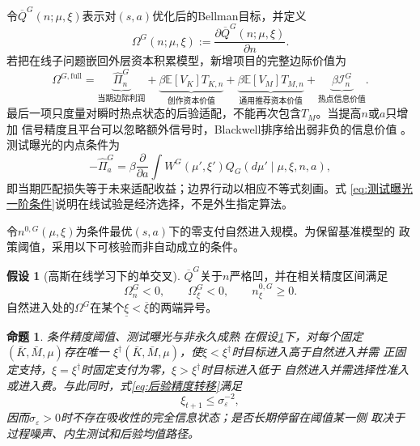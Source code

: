 \documentclass[UTF8, a4paper, 12pt, fontset=fandol]{ctexart}
\newtheorem{proposition}[theorem]{命题}
\theoremstyle{definition}
\newtheorem{assumption}{假设}[section]
\theoremstyle{remark}
\newcommand{\E}{\mathbb{E}}
\begin{document}
令$\overline Q^G(n;\mu,\xi)$表示对$(s,a)$优化后的Bellman目标，并定义
\begin{equation}
  \Omega^G(n;\mu,\xi)
  :=\frac{\partial\overline Q^G(n;\mu,\xi)}{\partial n}.
  \label{eq:贝叶斯动态边际进入}
\end{equation}
若把在线子问题嵌回外层资本积累模型，新增项目的完整边际价值为
\begin{equation}
  \Omega^{G,\mathrm{full}}
  =\underbrace{\widehat\Pi_n^G}_{\text{当期边际利润}}
  +\underbrace{\beta\E[V_K]T_{K,n}}
  _{\text{创作资本价值}}
  +\underbrace{\beta\E[V_M]T_{M,n}}
  _{\text{通用推荐资本价值}}
  +\underbrace{\beta\mathcal I_n^G}_{\text{热点信息价值}}.
  \label{eq:贝叶斯边际价值分解}
\end{equation}
最后一项只度量对瞬时热点状态的后验适配，不能再次包含$T_M$。当提高$n$或$a$只增加
信号精度且平台可以忽略额外信号时，Blackwell排序给出弱非负的信息价值
\citep{blackwell1953experiments}。测试曝光的内点条件为
\begin{equation}
  -\widehat\Pi_a^G
  =\beta\frac{\partial}{\partial a}
  \int W^G(\mu',\xi')Q_G(d\mu'\mid\mu,\xi,n,a),
  \label{eq:测试曝光一阶条件}
\end{equation}
即当期匹配损失等于未来适配收益；边界行动以相应不等式刻画。式
\eqref{eq:测试曝光一阶条件}说明在线试验是经济选择，不是外生指定算法。

令$n^{0,G}(\mu,\xi)$为条件最优$(s,a)$下的零支付自然进入规模。为保留基准模型的
政策阈值，采用以下可核验而非自动成立的条件。
\begin{assumption}[高斯在线学习下的单交叉]
  \label{ass:贝叶斯单交叉}
  $\overline Q^G$关于$n$严格凹，并在相关精度区间满足
  \begin{equation}
    \Omega_n^G<0,
    \qquad
    \Omega_\xi^G<0,
    \qquad
    n_\xi^{0,G}\geq0.
    \label{eq:贝叶斯单交叉条件}
  \end{equation}
  自然进入处的$\Omega^G$在某个$\underline\xi<\overline\xi$的两端异号。
\end{assumption}

\begin{proposition}{条件精度阈值、测试曝光与非永久成熟}
  \label{prop:贝叶斯精度阈值}
  在假设\ref{ass:贝叶斯单交叉}下，对每个固定$(\bar K,\bar M,\mu)$存在唯一
  $\xi^\dagger(\bar K,\bar M,\mu)$，使$\xi<\xi^\dagger$时目标进入高于自然进入并需
  正固定支持，$\xi=\xi^\dagger$时固定支付为零，$\xi>\xi^\dagger$时目标进入低于
  自然进入并需选择性准入或进入费。与此同时，式\eqref{eq:后验精度转移}满足
  \begin{equation*}
    \xi_{t+1}\leq \sigma_\varepsilon^{-2},
  \end{equation*}
  因而$\sigma_\varepsilon>0$时不存在吸收性的完全信息状态；是否长期停留在阈值某一侧
  取决于过程噪声、内生测试和后验均值路径。
\end{proposition}
\end{document}
